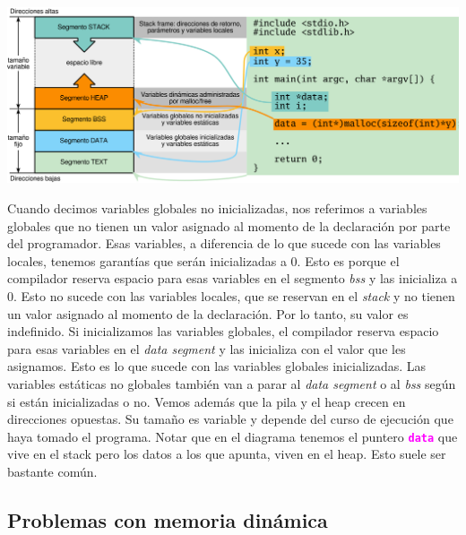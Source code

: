 \documentclass[]{scrartcl}
\newcommand{\hl}[1]{\textcolor{magenta}{\textbf{\texttt{#1}}}}
\begin{document}
\begin{center}
  \includegraphics[scale=0.39]{./img/memory.png}  
  \label{fig:memoria}
\end{center}

Cuando decimos variables globales no inicializadas, nos referimos a variables globales que no tienen un valor asignado al momento de la declaración por parte del programador. Esas variables, a diferencia de lo que sucede con las variables locales, tenemos garantías que serán inicializadas a 0. Esto es porque el compilador reserva espacio para esas variables en el segmento \textit{bss} y las inicializa a 0. Esto no sucede con las variables locales, que se reservan en el \textit{stack} y no tienen un valor asignado al momento de la declaración. Por lo tanto, su valor es indefinido.
Si inicializamos las variables globales, el compilador reserva espacio para esas variables en el \textit{data segment} y las inicializa con el valor que les asignamos. Esto es lo que sucede con las variables globales inicializadas. Las variables estáticas no globales también van a parar al \textit{data segment} o al \textit{bss} según si están inicializadas o no. 
Vemos además que la pila y el heap crecen en direcciones opuestas. Su tamaño es variable y depende del curso de ejecución que haya tomado el programa. Notar que en el diagrama tenemos el puntero \hl{data} que vive en el stack pero los datos a los que apunta, viven en el heap. Esto suele ser bastante común.

\subsection*{Problemas con memoria dinámica}
\end{document}
